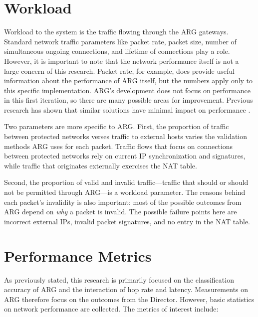 \section{Workload}
\label{sec:workload}
\par Workload to the system is the traffic flowing through the \ac{ARG} gateways. Standard network traffic parameters like packet rate, packet size, number of simultaneous ongoing connections, and lifetime of connections play a role. However, it is important to note that the network performance itself is not a large concern of this research. Packet rate, for example, does provide useful information about the performance of \ac{ARG} itself, but the numbers apply only to this specific implementation. \ac{ARG}'s development does not focus on performance in this first iteration, so there are many possible areas for improvement. Previous research has shown that similar solutions have minimal impact on performance \cite{NAH}. 

\par Two parameters are more specific to \ac{ARG}. First, the proportion of traffic between protected networks verses traffic to external hosts varies the validation methods \ac{ARG} uses for each packet. Traffic flows that focus on connections between protected networks rely on current \ac{IP} synchronization and signatures, while traffic that originates externally exercises the \ac{NAT} table.

\par Second, the proportion of valid and invalid traffic---traffic that should or should not be permitted through \ac{ARG}---is a workload parameter. The reasons behind each packet's invalidity is also important: most of the possible outcomes from \ac{ARG} depend on \textit{why} a packet is invalid. The possible failure points here are incorrect external \acp{IP}, invalid packet signatures, and no entry in the \ac{NAT} table.

\section{Performance Metrics}
\label{sec:metrics}
\par As previously stated, this research is primarily focused on the classification accuracy of \ac{ARG} and the interaction of hop rate and latency. Measurements on \ac{ARG} therefore focus on the outcomes from the Director. However, basic statistics on network performance are collected. The metrics of interest include:

